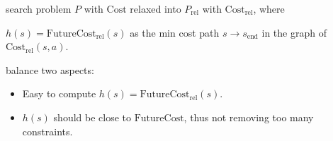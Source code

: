  search problem $P$ with $\text{Cost}$ relaxed
into $P_\text{rel}$ with $\text{Cost}_\text{rel}$, where

 $h(s) = \text{FutureCost}_\text{rel}(s)$ as the min cost
path $s \rightarrow s_{\text{end}}$ in the graph of
$\text{Cost}_\text{rel}(s,a)$.

 balance two aspects:
\begin{itemize}
    \item Easy to compute $h(s) = \text{FutureCost}_\text{rel}(s)$.
    \item $h(s)$ should be close to $\text{FutureCost}$, thus not removing too
        many constraints.
\end{itemize}